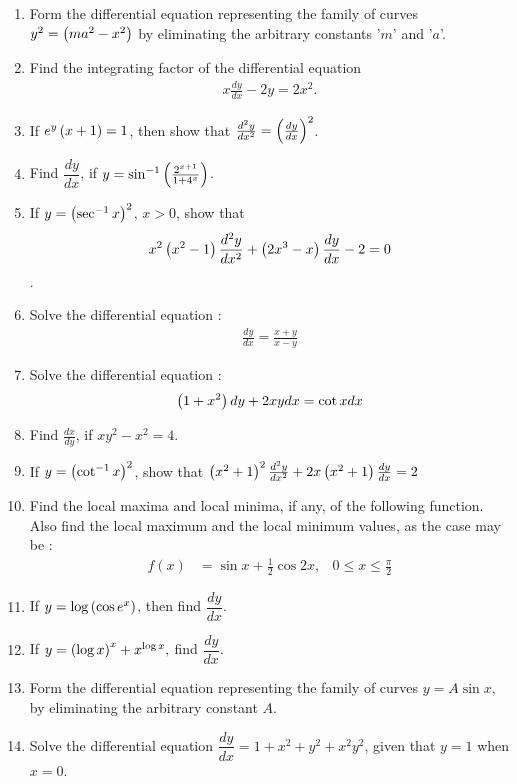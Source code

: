 \begin{enumerate}
\item Form the differential equation representing the family of curves $y^{2}=\left(ma^{2}-x^{2}\right)$ by eliminating the arbitrary constants '$m$' and  '$a$'.
\item Find the integrating factor of the differential equation
\begin{align*}
x \frac{dy}{dx}-2y=2x^{2}. 
\end{align*}
 \item If $e^{y}\left(x+1\right)=1$, then show that $\frac{d^2y}{dx^2}=\left(\frac{dy}{dx}\right)^2$.
\item Find $\dfrac{dy}{dx}$, if $y=\sin^{-1}\left(\frac{2^{x+1}}{1+4^{x}}\right)$.
\item If $y=\left(\sec^{-1}x\right)^{2}$, $x>0$, show that
 \begin{align*}
 x^{2}\left(x^{2}-1\right)\frac{d^{2}y}{dx^{2}}+\left(2x^{3}-x\right) \frac{dy}{dx}-2=0 
 \end{align*}.
\item Solve the differential equation :
\begin{align*}
   \frac{dy}{dx} = \frac{x + y}{x - y} 
\end{align*}
 \item Solve the differential equation :
 \begin{align*}
   \left(1+x^{2}\right)dy+2xy dx =\cot{x}dx
 \end{align*}
\item Find 
$\frac{dx}{dy}$, if $ xy^{2}-x^{2} = 4$.  
\item If $y = \left(\cot^{-1}{x}\right)^{2}$, show that $\left({x}^2+{1}\right)^{2}\frac{d^2y}{dx^2}+2{x}\left({x^2}+{1}\right)\frac{dy}{dx} = 2$
\item Find the local maxima and local minima, if any, of the following function. Also find the local maximum and the local minimum values, as the case may be :
 \begin{align*}
  f(x) &= \sin x + \frac{1}{2} \cos 2x, & 0 \leq x \leq \frac{\pi}{2}
 \end{align*}
\item If $y = \log \left(\cos e^x\right)$, then find $\dfrac{dy}{dx}$.
\item If $y=\left(\log x\right)^{x}+x^{\log x},$ find $\dfrac{dy}{dx}$.
\item Form the differential equation representing the family of curves $y = A \sin x $, by eliminating the arbitrary constant $A$.
\item Solve the differential equation $\dfrac{dy} {dx} =1+x^{2}+y^{2}+x^{2}y^{2}$, given that $y = 1$ when $x = 0$.

\end{enumerate}
